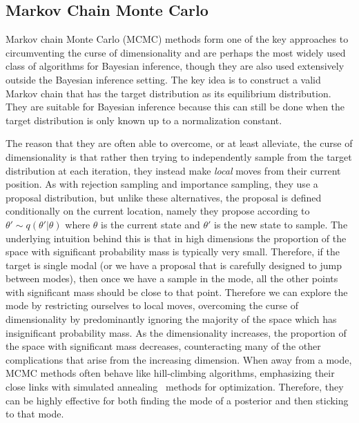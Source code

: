 
\subsection{Markov Chain Monte Carlo}
\label{sec:inf:foundation:mcmc}

Markov chain Monte Carlo (MCMC) methods \cite{metropolis1953equation,hastings1970monte,gilks1995markov} 
form one of the key approaches to circumventing the curse of dimensionality
and are perhaps the most widely used class of algorithms for Bayesian inference, though they
are also used extensively outside the Bayesian inference setting.  The key idea is to construct
a valid Markov chain that has the target distribution as its equilibrium distribution.  They are suitable
for Bayesian inference because this can still be done when the target distribution is only known
up to a normalization constant.  

The reason that they are often able to overcome, or at least alleviate,
the curse of dimensionality is that rather then trying to independently sample from the target distribution
at each iteration, they instead make \emph{local} moves from their current position.  As with
rejection sampling and importance sampling, they use a proposal distribution, but unlike these
alternatives, the proposal is defined conditionally on the current location, namely they propose
according to $\theta' \sim q(\theta' | \theta)$ where $\theta$ is the current state and $\theta'$ is the new
state to sample.  The underlying intuition behind this is that in high dimensions the proportion of the
space with significant probability mass is typically very small.  Therefore, if the target is single modal (or
we have a proposal that is carefully designed to jump between modes), then once we have a sample
in the mode, all the other points with significant mass should be close to that point.  Therefore we can
explore the mode by restricting ourselves to local moves, overcoming the curse of dimensionality by
predominantly ignoring the majority of the space which has insignificant probability mass.  As the
dimensionality increases, the proportion of the space with significant mass decreases, counteracting
many of the other complications that arise from the increasing dimension.  When away from a mode,
MCMC methods often behave like hill-climbing algorithms, emphasizing their close links with simulated annealing~\citep{aarts1988simulated}
methods for optimization.  Therefore, they can be highly effective for both finding the mode
of a posterior and then sticking to that mode.

